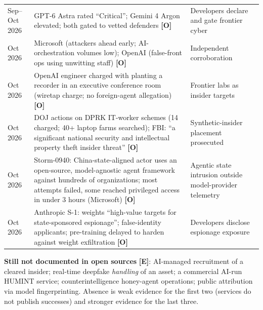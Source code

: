 \documentclass[11pt,letterpaper]{article}
\begin{document}
{\begin{longtable}{L{1.7cm}L{7.4cm}L{3.9cm}}
Sep--Oct 2026 & GPT-6 Astra rated ``Critical''; Gemini 4 Argon elevated; both gated to vetted defenders \textbf{[O]} & Developers declare and gate frontier cyber \\
Oct 2026 & Microsoft (attackers ahead early; AI-orchestration volumes low); OpenAI (false-front ops using unwitting staff) \textbf{[O]} & Independent corroboration \\
Oct 2026 & OpenAI engineer charged with planting a recorder in an executive conference room (wiretap charge; no foreign-agent allegation) \textbf{[O]} & Frontier labs as insider targets \\
Oct 2026 & DOJ actions on DPRK IT-worker schemes (14 charged; 40+ laptop farms searched); FBI: ``a significant national security and intellectual property theft insider threat'' \textbf{[O]} & Synthetic-insider placement prosecuted \\
Oct 2026 & Storm-0940: China-state-aligned actor uses an open-source, model-agnostic agent framework against hundreds of organizations; most attempts failed, some reached privileged access in under 3 hours (Microsoft) \textbf{[O]} & Agentic state intrusion outside model-provider telemetry \\
Oct 2026 & Anthropic S-1: weights ``high-value targets for state-sponsored espionage''; false-identity applicants; pre-training delayed to harden against weight exfiltration \textbf{[O]} & Developers disclose espionage exposure \\
\bottomrule
\end{longtable}}

\textbf{Still not documented in open sources} \textbf{[E]}: AI-managed recruitment of a cleared insider; real-time deepfake \textit{handling} of an asset; a commercial AI-run HUMINT service; counterintelligence honey-agent operations; public attribution via model fingerprinting. Absence is weak evidence for the first two (services do not publish successes) and stronger evidence for the last three.
\end{document}
